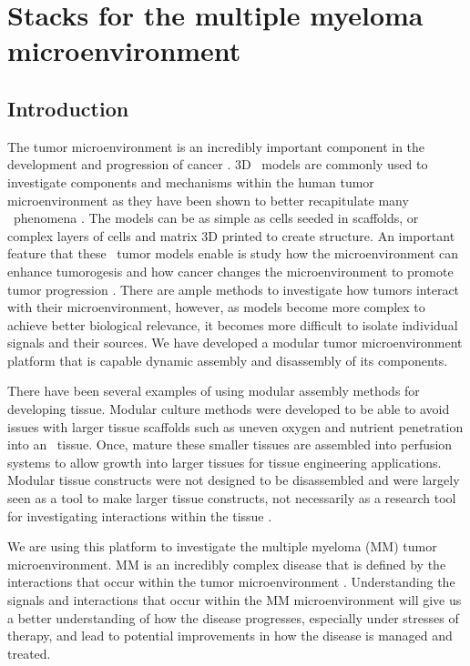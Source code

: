 \chapter{Stacks for the multiple myeloma microenvironment}
\label{Chap:Stacks}

\section{Introduction}

The tumor microenvironment is an incredibly important component in the development and progression of cancer \cite{Hanahan2012, Whiteside2008, Lorusso2008}. 3D \invitro\ models are commonly used to investigate components and mechanisms within the human tumor microenvironment as they have been shown to better recapitulate many \invivo\ phenomena \cite{Sung2013, Fischbach2007, Hickman2014Three-dimensionalVivo., stock2016capturing, Baker2012, Debnath2005, Wu2014, Asghar2015}. The models can be as simple as cells seeded in scaffolds, or complex layers of cells and matrix 3D printed to create structure. An important feature that these \invitro\ tumor models enable is study how the microenvironment can enhance tumorogesis and how cancer changes the microenvironment to promote tumor progression \cite{Verbridge2010, Chandler2012, Ingber2008, Polyak2009}. There are ample methods to investigate how tumors interact with their microenvironment, however, as models become more complex to achieve better biological relevance, it becomes more difficult to isolate individual signals and their sources. We have developed a modular tumor microenvironment platform that is capable dynamic assembly and disassembly of its components. 

There have been several examples of using modular assembly methods for developing tissue. Modular culture methods were developed to be able to avoid issues with larger tissue scaffolds such as uneven oxygen and nutrient penetration into an \invitro\ tissue. Once, mature these smaller tissues are assembled into perfusion systems to allow growth into larger tissues for tissue engineering applications. Modular tissue constructs were not designed to be disassembled and were largely seen as a tool to make larger tissue constructs, not necessarily as a research tool for investigating interactions within the tissue \cite{Lovett2009, Lee2012a, Bruzewicz2008, Nichol2009}.

We are using this platform to investigate the multiple myeloma (MM) tumor microenvironment. MM is an incredibly complex disease that is defined by the interactions that occur within the tumor microenvironment \cite{Mahindra2010a, Manier2012, Ribatti2006}. Understanding the signals and interactions that occur within the MM microenvironment will give us a better understanding of how the disease progresses, especially under stresses of therapy, and lead to potential improvements in how the disease is managed and treated.

